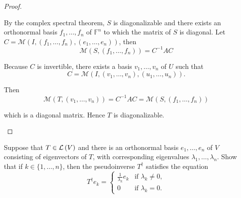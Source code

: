 \begin{proof}
\begin{enumerate}[label={(\alph*)}]
              By the complex spectral theorem, $S$ is diagonalizable and there exists an orthonormal basis $f_{1}, \ldots, f_{n}$ of $\mathbb{F}^{n}$ to which the matrix of $S$ is diagonal. Let $C = \mathcal{M}(I, (f_{1}, \ldots, f_{n}), (e_{1}, \ldots, e_{n}))$, then
              \[
                  \mathcal{M}(S, (f_{1},\ldots, f_{n})) = C^{-1}AC
              \]

              Because $C$ is invertible, there exists a basis $v_{1}, \ldots, v_{n}$ of $U$ such that
              \[
                  C = \mathcal{M}(I, (v_{1}, \ldots, v_{n}), (u_{1}, \ldots, u_{n})).
              \]

              Then
              \[
                  \mathcal{M}(T, (v_{1}, \ldots, v_{n})) = C^{-1}AC = \mathcal{M}(S, (f_{1},\ldots, f_{n}))
              \]

              which is a diagonal matrix. Hence $T$ is diagonalizable.
    \end{enumerate}
\end{proof}
\newpage

\begin{exercise}\label{chapter7:sectionB:exercise25}
    Suppose that $T \in \mathcal{L}\left({V}\right)$ and there is an orthonormal basis $e_{1}, \ldots, e_{n}$ of $V$ consisting of eigenvectors of $T$, with corresponding eigenvalues $\lambda_{1}, \ldots, \lambda_{n}$. Show that if $k \in \{1, \ldots, n\}$, then the pseudoinverse $T^{\dagger}$ satisfies the equation
    \[
        T^{\dagger}e_{k} = \begin{cases}
            \frac{1}{\lambda_{k}}e_{k} & \text{if $\lambda_{k}\ne 0$}, \\
            0                          & \text{if $\lambda_{k} = 0$}.
        \end{cases}
    \]
\end{exercise}

